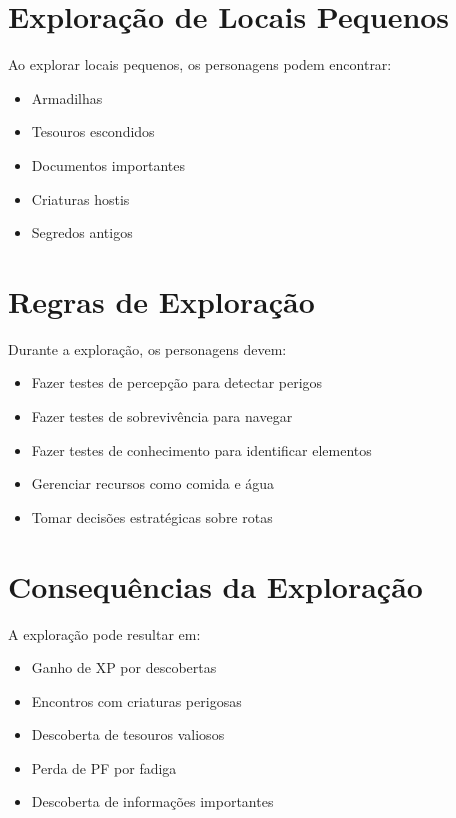 \section{Exploração de Locais Pequenos}

Ao explorar locais pequenos, os personagens podem encontrar:

\begin{itemize}
    \item Armadilhas
    \item Tesouros escondidos
    \item Documentos importantes
    \item Criaturas hostis
    \item Segredos antigos
\end{itemize}

\section{Regras de Exploração}

Durante a exploração, os personagens devem:

\begin{itemize}
    \item Fazer testes de percepção para detectar perigos
    \item Fazer testes de sobrevivência para navegar
    \item Fazer testes de conhecimento para identificar elementos
    \item Gerenciar recursos como comida e água
    \item Tomar decisões estratégicas sobre rotas
\end{itemize}

\section{Consequências da Exploração}

A exploração pode resultar em:

\begin{itemize}
    \item Ganho de XP por descobertas
    \item Encontros com criaturas perigosas
    \item Descoberta de tesouros valiosos
    \item Perda de PF por fadiga
    \item Descoberta de informações importantes
\end{itemize}